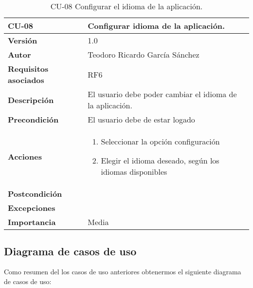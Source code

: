 \begin{table}[p]
	\centering
	\begin{tabularx}{\linewidth}{ p{} p{} }
		\toprule
		\textbf{CU-08}    & \textbf{Configurar idioma de la aplicación.}\\
		\toprule
		\textbf{Versión}              & 1.0    \\
		\textbf{Autor}                & Teodoro Ricardo García Sánchez \\
		\textbf{Requisitos asociados} & RF6 \\
		\textbf{Descripción}          & El usuario debe poder cambiar el idioma de la aplicación.  \\
		\textbf{Precondición}         & El usuario debe de estar logado \\
		\textbf{Acciones}             &
		\begin{enumerate}
			\def\labelenumi{\arabic{enumi}.}
			\tightlist
			\item Seleccionar la opción configuración
			\item Elegir el idioma deseado, según los idiomas disponibles
		\end{enumerate}\\
		\textbf{Postcondición}        &  \\
		\textbf{Excepciones}          &  \\
		\textbf{Importancia}          & Media \\
		\bottomrule
	\end{tabularx}
	\caption{CU-08 Configurar el idioma de la aplicación.}
\end{table}

\subsection{Diagrama de casos de uso}

Como resumen del los casos de uso anteriores obtenermos el siguiente diagrama de casos de uso:



